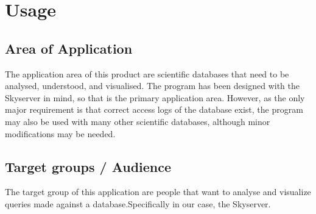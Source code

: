 \section{Usage}
\subsection{Area of Application}
The application area of this product are scientific databases that need to be analysed, understood, and visualised.
The program has been designed with the Skyserver in mind, so that is the primary application area.
However, as the only major requirement is that correct access logs of the database exist,
the program may also be used with many other scientific databases, although minor modifications may be needed.


%



\subsection{Target groups / Audience}

The target group of this application are people that want to analyse 
and visualize queries made against a database.Specifically
in our case, the Skyserver.

